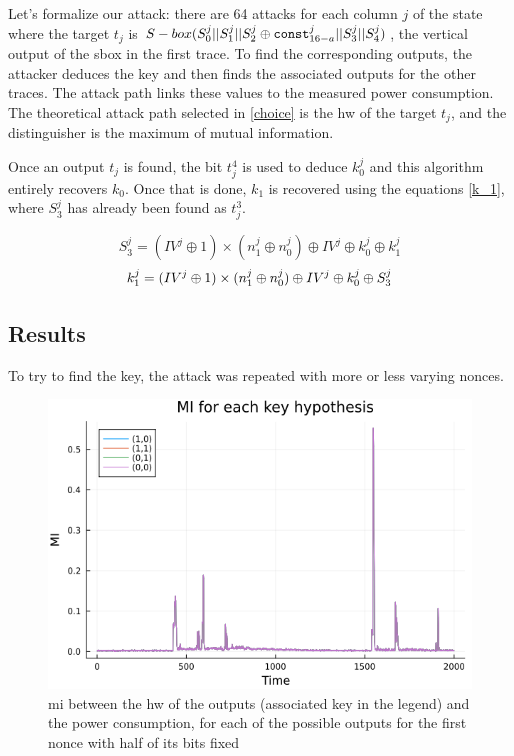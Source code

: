 \documentclass[11pt,technote]{IEEEtran}
\begin{document}
		Let's formalize our attack: there are 64 attacks for each column $j$ of the state where the target $t_j$ is $S-box(S_0^j||S_1^j||S_2^j \oplus \verb|const|_{16-a}^j||S_3^j||S_4^j)$, the vertical output of the \ac{sbox} in the first trace. To find the corresponding outputs, the attacker deduces the key and then finds the associated outputs for the other traces. The attack path links these values to the measured power consumption. The theoretical attack path selected in \ref{choice} is the \ac{hw} of the target $t_j$, and the distinguisher is the maximum of mutual information.
		
		Once an output $t_j$ is found, the bit $t_j^4$ is used to deduce $k_0^j$ and this algorithm entirely recovers $k_0$. Once that is done, $k_1$ is recovered using the equations \ref{k_1}, where $S_3^j$ has already been found as $t_j^3$.
		
		\begin{equation} 
			S_3^j = (IV^j \oplus 1) \times (n_1^j \oplus n_0^j) \oplus IV^j \oplus k_0^j \oplus k_1^j
		\end{equation}
		\begin{equation} \label{k_1}
			k_1^j = (IV^j \oplus 1) \times (n_1^j \oplus n_0^j) \oplus IV^j \oplus k_0^j \oplus S_3^j\\
		\end{equation}
		
		\subsection{Results}
		To try to find the key, the attack was repeated with more or less varying nonces.
		
		\begin{figure}[h]
			\centering
			\includegraphics[scale=0.4]{img_files/nonces_half_fixed}
			\caption{\ac{mi} between the \ac{hw} of the outputs (associated key in the legend) and the power consumption, for each of the possible outputs for the first nonce with half of its bits fixed}
			\label{half_fixed}
		\end{figure}
		
\end{document}
